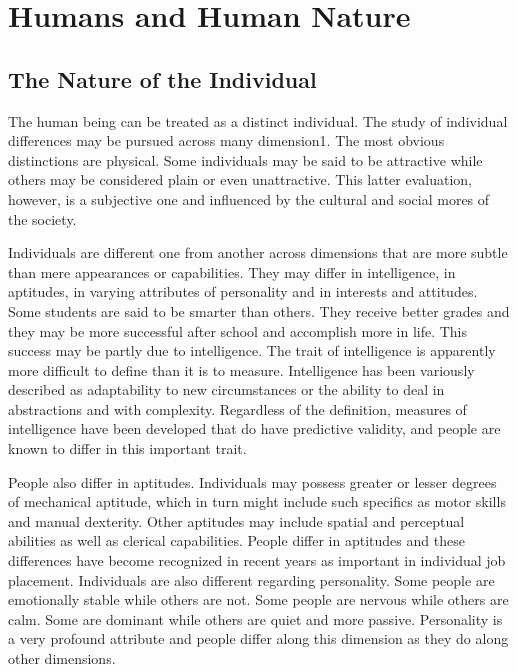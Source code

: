 \section{Humans and Human Nature}

\subsection{The Nature of the Individual}

The human being can be treated as a distinct individual. The study of individual differences may be pursued across many dimension1. The most obvious distinctions are physical. Some individuals may be said to be attractive while others may be considered plain or even unattractive. This latter evaluation, however, is a subjective one and influenced by the cultural and social mores of the society.

Individuals are different one from another across dimensions that are more subtle than mere appearances or capabilities. They may differ in intelligence, in aptitudes, in varying attributes of personality and in interests and attitudes. Some students are said to be smarter than others. They receive better grades and they may be more successful after school and accomplish more in life. This success may be partly due to intelligence. The trait of intelligence is apparently more difficult to define than it is to measure. Intelligence has been variously described as adaptability to new circumstances or the ability to deal in abstractions and with complexity. Regardless of the definition, measures of intelligence have been developed that do have predictive validity, and people are known to differ in this important trait.

People also differ in aptitudes. Individuals may possess greater or lesser degrees of mechanical aptitude, which in turn might include such specifics as motor skills and manual dexterity. Other aptitudes may include spatial and perceptual abilities as well as clerical capabilities. People differ in aptitudes and these differences have become recognized in recent years as important in individual job placement. Individuals are also different regarding personality. Some people are emotionally stable while others are not. Some people are nervous while others are calm. Some are dominant while others are quiet and more passive. Personality is a very profound attribute and people differ along this dimension as they do along other dimensions.

